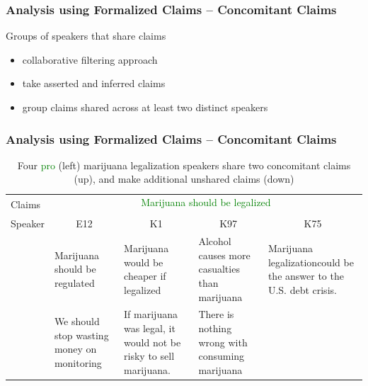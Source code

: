\documentclass{beamer}
\newcommand{\pro}[1]{\textcolor{green}{#1}}
\newcommand{\con}[1]{\textcolor{red}{#1}}
\begin{document}
\begin{frame}
	\frametitle{Analysis using Formalized Claims -- Concomitant Claims}
	Groups of speakers that share claims
	\begin{itemize}
		\item collaborative filtering approach \cite{he2017neural}
		\item take asserted and inferred claims
		\item group claims shared across at least two distinct speakers
	\end{itemize}
\end{frame}

\begin{frame}
	\frametitle{Analysis using Formalized Claims -- Concomitant Claims}
\begin{table}[t]
	\scriptsize{
		\begin{tabular}{p{1cm} | p{1.3cm} p{1.5cm} p{1.5cm} p{1.5cm} |  }
	\toprule
			\multirow{2}{*}{\parbox{1cm}{Claims}} &

	\multicolumn{4}{c|}{\pro{Marijuana should be legalized}}
	\\[1ex]

	\\[2ex]

	Speaker & 
	\multicolumn{1}{c}{\small{E12}} &
	\multicolumn{1}{c}{\small{K1}}  &
	\multicolumn{1}{c}{\small{K97}} &
	\multicolumn{1}{c|}{\small{K75}}

	\\[1ex]

	\hline

	& 
	Marijuana should be regulated & 
	Marijuana would be cheaper if legalized & 
	Alcohol causes more casualties than marijuana & 
	Marijuana legalizationcould be the answer to the U.S. debt crisis.

	\\
	\hline

	& 
	We should stop wasting money on monitoring & 
	If marijuana was legal, it would not be risky to sell marijuana. &
	There is nothing wrong with consuming marijuana & 
	

	\\
	\bottomrule
\end{tabular}
}
	\caption{Four \pro{pro} (left)  
	marijuana legalization speakers share two concomitant claims (up),
	and make additional unshared claims (down)
	}
\end{table}

\end{frame}
\end{document}
